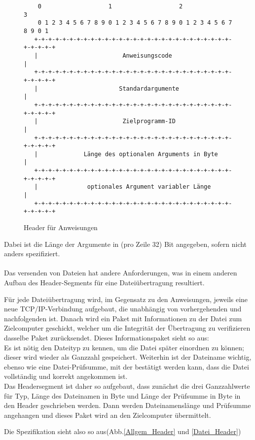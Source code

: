 \newpage

\begin{figure}[h] 
\begin{lstlisting}
   	0                   1                   2                   3
    0 1 2 3 4 5 6 7 8 9 0 1 2 3 4 5 6 7 8 9 0 1 2 3 4 5 6 7 8 9 0 1
   +-+-+-+-+-+-+-+-+-+-+-+-+-+-+-+-+-+-+-+-+-+-+-+-+-+-+-+-+-+-+-+-+
   |                        Anweisungscode                         |
   +-+-+-+-+-+-+-+-+-+-+-+-+-+-+-+-+-+-+-+-+-+-+-+-+-+-+-+-+-+-+-+-+
   |                       Standardargumente                       |
   +-+-+-+-+-+-+-+-+-+-+-+-+-+-+-+-+-+-+-+-+-+-+-+-+-+-+-+-+-+-+-+-+
   |                        Zielprogramm-ID                        |
   +-+-+-+-+-+-+-+-+-+-+-+-+-+-+-+-+-+-+-+-+-+-+-+-+-+-+-+-+-+-+-+-+
   |             Länge des optionalen Arguments in Byte            |
   +-+-+-+-+-+-+-+-+-+-+-+-+-+-+-+-+-+-+-+-+-+-+-+-+-+-+-+-+-+-+-+-+
   |              optionales Argument variabler Länge              |
   +-+-+-+-+-+-+-+-+-+-+-+-+-+-+-+-+-+-+-+-+-+-+-+-+-+-+-+-+-+-+-+-+
\end{lstlisting}
\caption{Header für Anweisungen}
\label{Anweisungs_Header}
\end{figure}

Dabei ist die Länge der Argumente in (pro Zeile 32) Bit angegeben, sofern nicht anders spezifiziert.\\\\
Das versenden von Dateien hat andere Anforderungen, was in einem anderen Aufbau des Header-Segments für eine Dateiübertragung resultiert.\par 
Für jede Dateiübertragung wird, im Gegensatz zu den Anweisungen, jeweils eine neue TCP/IP-Verbindung aufgebaut, die unabhängig von vorhergehenden und nachfolgenden ist.
Danach wird ein Paket mit Informationen zu der Datei zum Zielcomputer geschickt, welcher um die Integrität der Übertragung zu verifizieren dasselbe Paket zurücksendet.
Dieses Informationspaket sieht so aus:\\
Es ist nötig den Dateityp zu kennen, um die Datei später einordnen zu können; dieser wird wieder als Ganzzahl gespeichert.
Weiterhin ist der Dateiname wichtig, ebenso wie eine Datei-Prüfsumme, mit der bestätigt werden kann, dass die Datei vollständig und korrekt angekommen ist.\\
Das Headersegment ist daher so aufgebaut, dass zunächst die drei Ganzzahlwerte für Typ, Länge des Dateinamen in Byte und Länge der Prüfsumme in Byte in den Header geschrieben werden. Dann werden Dateinamenslänge und Prüfsumme angehangen und dieses Paket wird an den Zielcomputer übermittelt.\par
Die Spezifikation sieht also so aus(Abb.\ref{Allgem_Header} und \ref{Datei_Header})\\

